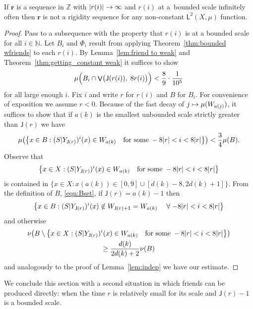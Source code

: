 \documentclass[10pt]{amsart}
\theoremstyle{definition}\newtheorem{defi}[theo]{Definition}\newtheorem{rema}[theo]{Remark}\newtheorem{exam}[theo]{Example}\newtheorem{exem}[theo]{Example}\newtheorem{nota}[theo]{Notation}
\DeclareMathOperator{\bad}{\mathsf{V}}
\newcommand{\N}{\mathbb{N}}
\newcommand{\Z}{\mathbb{Z}}
\newcommand{\lp}{\mathsf{L}}
\newcommand{\scl}{\mathsf{J}}
\newcommand{\bfr}{\mathbf{r}}
\let\originalleft\left
\let\originalright\right
\renewcommand{\left}{\mathopen{}\mathclose\bgroup\originalleft}
\renewcommand{\right}{\aftergroup\egroup\originalright}
\renewcommand*{\to}{\mathchoice{\longrightarrow}{\rightarrow}{\rightarrow}{\rightarrow}}
\let\oldmapsto\mapsto
\renewcommand*{\mapsto}{\mathchoice{\longmapsto}{\oldmapsto}{\oldmapsto}{\oldmapsto}}
\let\oldforall\forall
\renewcommand*{\forall}{\mathrel{\oldforall}}
\begin{document}
\begin{coro}\label{cor:bounded mmix}
If $\bfr$ is a sequence in $\Z$ with $|r(i)| \to \infty$ and $r(i)$ at a~bounded scale infinitely often then $\bfr$ is not a rigidity sequence for any non-constant $\lp^2(X,\mu)$ function.
\end{coro}

\begin{proof}
Pass to a subsequence with the property that $r(i)$ is at a bounded scale for all $i \in \N$. Let $B_i$ and $\Phi_i$ result from applying Theorem~\ref{thm:bounded wfriends} to each $r(i)$. By Lemma~\ref{lem:friend to weak} and Theorem~\ref{thm:getting_constant weak} it suffices to show
\[
\mu\Bigl(B_i \cap \bad\bigl(\scl(r(i)),\;8r(i)\bigr) \Bigr) < \frac{8}{9} \cdot \frac{1}{10^5}
\]
for all large enough $i$. Fix $i$ and write $r$ for $r(i)$ and $B$ for $B_i$. For convenience of exposition we assume $r < 0$. Because of the fast decay of $j \mapsto \mu(W_{a(j)})$, it suffices to show that if $a(k)$ is the smallest unbounded scale strictly greater than $\scl(r)$ we have
\[
\mu\left(\left\{x\in B:(S|Y_{\scl(r)})^i(x)\in W_{a(k)}\quad \text{for some}\; -8|r|<i<8|r|\right\}\right)<\frac 3 4 \mu(B).
\]
Observe that
\[
\left\{x\in X:(S|Y_{\scl(r)})^i(x)\in W_{a(k)} \quad\text{for some}\;-8|r|<i<8|r|\right\}
\]
is contained in $\{x \in X : x(a(k))\in [0,9] \cup [d(k)-8,2d(k)+1] \}$. From the definition of $B$, \eqref{eqn:Bset}, if $\scl(r)=a(k)-1$ then
\[
\left\{x\in B:(S|Y_{\scl(r)})^i(x)\notin W_{\scl(r)+1}=W_{a(k)} \quad\forall -8|r|<i<8|r| \right\}
\]
and otherwise
\begin{multline*}
\nu\left(B \setminus \left\{x\in X:(S|Y_{\scl(r)})^i(x)\in W_{a(k)} \quad\text{for some}\; -8|r|<i<8|r|\right\}\right)\\
\geq \frac{d(k)}{2d(k)+2}\nu(B)
\end{multline*}
and analogously to the proof of Lemma~\ref{lem:indep} we have our estimate.
\end{proof}

We conclude this section with a second situation in which friends can be produced directly: when the time $r$ is relatively small for its scale and $\scl(r) - 1$ is a bounded scale.
\end{document}
